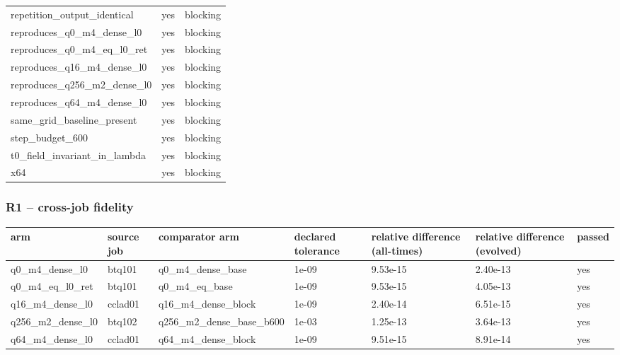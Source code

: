 \documentclass[11pt]{article}
\begin{document}
\begin{table}[htbp]
\begin{tabular}{lll}
repetition\_output\_identical & yes & blocking \\
reproduces\_q0\_m4\_dense\_l0 & yes & blocking \\
reproduces\_q0\_m4\_eq\_l0\_ret & yes & blocking \\
reproduces\_q16\_m4\_dense\_l0 & yes & blocking \\
reproduces\_q256\_m2\_dense\_l0 & yes & blocking \\
reproduces\_q64\_m4\_dense\_l0 & yes & blocking \\
same\_grid\_baseline\_present & yes & blocking \\
step\_budget\_600 & yes & blocking \\
t0\_field\_invariant\_in\_lambda & yes & blocking \\
x64 & yes & blocking \\
\hline\end{tabular}
\end{table}
\subsubsection{R1 -- cross-job fidelity}
\begin{table}[htbp]\centering\small
\begin{tabular}{lllllll}\hline
arm & source job & comparator arm & declared tolerance & relative difference (all-times) & relative difference (evolved) & passed \\ \hline
q0\_m4\_dense\_l0 & btq101 & q0\_m4\_dense\_base & 1e-09 & 9.53e-15 & 2.40e-13 & yes \\
q0\_m4\_eq\_l0\_ret & btq101 & q0\_m4\_eq\_base & 1e-09 & 9.53e-15 & 4.05e-13 & yes \\
q16\_m4\_dense\_l0 & cclad01 & q16\_m4\_dense\_block & 1e-09 & 2.40e-14 & 6.51e-15 & yes \\
q256\_m2\_dense\_l0 & btq102 & q256\_m2\_dense\_base\_b600 & 1e-03 & 1.25e-13 & 3.64e-13 & yes \\
q64\_m4\_dense\_l0 & cclad01 & q64\_m4\_dense\_block & 1e-09 & 9.51e-15 & 8.91e-14 & yes \\
\hline\end{tabular}
\end{table}
\end{document}
